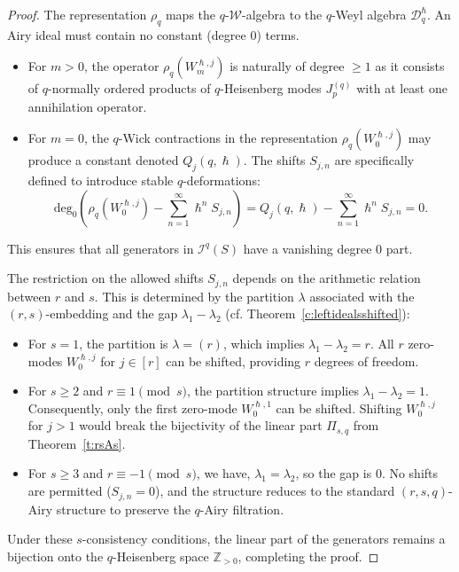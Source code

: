 \documentclass[reqno,11pt]{amsart}
\theoremstyle{plain}
\theoremstyle{definition}
\theoremstyle{remark}
\numberwithin{equation}{section}
\newcommand{\1}{\mathds{1}}
\newcommand{\2}{\frac{1}{2}}
\begin{document}
{\begin{proof}
					{The representation $\rho_q$ maps the $q$-$\mathcal{W}$-algebra to the $q$-Weyl algebra $\mathcal{D}_q^\hslash$. An Airy ideal must contain no constant (degree 0) terms. 
						\begin{itemize}
							\item For $m > 0$, the operator $\rho_q(W^{\hslash,j}_m)$ is naturally of degree $\geq 1$ as it consists of $q$-normally ordered products of $q$-Heisenberg modes $J^{(q)}_p$ with at least one annihilation operator.
							\item For $m = 0$, the $q$-Wick contractions in the representation $\rho_q(W^{\hslash,j}_0)$ may produce a constant denoted $Q_j(q, \hslash)$. The shifts $S_{j,n}$ are specifically defined  to introduce stable $q$-deformations:
							\begin{equation}
								\text{deg}_0 \left( \rho_q(W^{\hslash,j}_0) - \sum_{n=1}^\infty \hslash^n S_{j,n} \right) = Q_j(q, \hslash) - \sum_{n=1}^\infty \hslash^n S_{j,n} = 0.
							\end{equation}
						\end{itemize}
						This ensures that all generators in $\mathcal{I}^q(S)$ have a vanishing degree 0 part.}
					
					{The restriction on the allowed shifts $S_{j,n}$ depends on the arithmetic relation between $r$ and $s$. This is determined by the partition $\lambda$ associated with the $(r,s)$-embedding and the gap $\lambda_1 - \lambda_2$ (cf. Theorem~\ref{c:leftidealsshifted}):
						\begin{itemize}
							\item For $s=1$, the partition is $\lambda = (r)$, which implies $\lambda_1 - \lambda_2 = r$. All $r$ zero-modes $W^{\hslash,j}_0$ for $j \in [r]$ can be shifted, providing $r$ degrees of freedom.
							\item For $s \geq 2$ and $r \equiv 1 \pmod{s}$, the partition structure implies $\lambda_1 - \lambda_2 = 1$. Consequently, only the first zero-mode $W^{\hslash,1}_0$ can be shifted. Shifting $W^{\hslash,j}_0$ for $j > 1$ would break the bijectivity of the linear part $\Pi_{s,q}$ from Theorem~\ref{t:rsAs}.
							\item For $s \geq 3$ and $r \equiv -1 \pmod{s}$, we have, $\lambda_1 = \lambda_2$, so the gap is $0$. No shifts are permitted ($S_{j,n} = 0$), and the structure reduces to the standard $(r,s,q)$-Airy structure to preserve the $q$-Airy filtration.
						\end{itemize}
						Under these $s$-consistency conditions, the linear part of the generators remains a bijection onto the $q$-Heisenberg space $\mathbb{Z}_{>0}$, completing the proof.}
				\end{proof}
				
}
\end{document}
